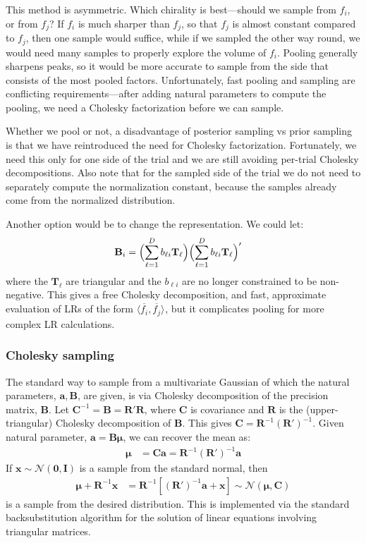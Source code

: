 \documentclass[a4paper,oneside,12pt,english]{report}
\def\ND{\mathcal{N}}
\def\expv#1#2{\bigl\langle#1\bigr\rangle_{#2}}
\def\Bmat{\mathbf{B}}
\def\Cmat{\mathbf{C}}
\def\Imat{\mathbf{I}}
\def\Rmat{\mathbf{R}}
\def\Tmat{\mathbf{T}}
\def\xvec{\mathbf{x}}
\def\muvec{\boldsymbol{\mu}}
\def\avec{\mathbf{a}}
\def\nulvec{\boldsymbol{0}}
\def\dot#1#2{\expv{#1,#2}{}}
\def\normal#1{\overline{#1}}
\begin{document}
This method is asymmetric. Which chirality is best---should we sample from $f_i$, or from $f_j$? If $f_i$ is much sharper than $f_j$, so that $f_j$ is almost constant compared to $f_j$, then one sample would suffice, while if we sampled the other way round, we would need many samples to properly explore the volume of $f_i$. Pooling generally sharpens peaks, so it would be more accurate to sample from the side that consists of the most pooled factors. Unfortunately, fast pooling and sampling are conflicting requirements---after adding natural parameters to compute the pooling, we need a Cholesky factorization before we can sample.

Whether we pool or not, a disadvantage of posterior sampling vs prior sampling is that we have reintroduced the need for Cholesky factorization. Fortunately, we need this only for one side of the trial and we are still avoiding per-trial Cholesky decompositions. Also note that for the sampled side of the trial we do not need to separately compute the normalization constant, because the samples already come from the normalized distribution. 

Another option would be to change the representation. We could let:
\begin{align}
\Bmat_i &= \Bigl(\sum_{\ell=1}^D b_{\ell i} \Tmat_\ell \Bigr)\Bigl(\sum_{\ell=1}^D b_{\ell i} \Tmat_\ell \Bigr)'
\end{align}  
where the $\Tmat_\ell$ are triangular and the $b_{\ell i}$ are no longer constrained to be non-negative. This gives a free Cholesky decomposition, and fast, approximate evaluation of LRs of the form $\dot{\normal{f_i}}{\normal{f_j}}$, but it complicates pooling for more complex LR calculations.


\subsubsection{Cholesky sampling}
The standard way to sample from a multivariate Gaussian of which the natural parameters, $\avec,\Bmat$, are given, is via Cholesky decomposition of the precision matrix, $\Bmat$. Let $\Cmat^{-1}=\Bmat=\Rmat'\Rmat$, where $\Cmat$ is covariance and $\Rmat$ is the (upper-triangular) Cholesky decomposition of $\Bmat$. This gives $\Cmat=\Rmat^{-1}(\Rmat')^{-1}$. Given natural parameter, $\avec=\Bmat\muvec$, we can recover the mean as:
\begin{align}
\muvec&=\Cmat\avec = \Rmat^{-1}(\Rmat')^{-1}\avec
\end{align}
If $\xvec\sim\ND(\nulvec,\Imat)$ is a sample from the standard normal, then 
\begin{align}
\muvec + \Rmat^{-1}\xvec &= \Rmat^{-1}[(\Rmat')^{-1}\avec + \xvec] \sim\ND(\muvec,\Cmat)
\end{align} 
is a sample from the desired distribution. This is implemented via the standard backsubstitution algorithm for the solution of linear equations involving triangular matrices.
\end{document}
